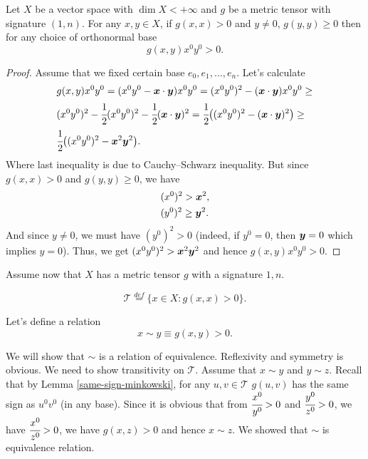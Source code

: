 \documentclass[main.tex]{subfiles}
\begin{document}
\begin{lemma}
\label{same-sign-minkowski}
Let $X$ be a vector space with $\dim X < +\infty$ and $g$ be a metric tensor with signature $(1, n)$. For any $x, y\in X$, if $g(x, x) > 0$ and $y\not=0$, $g(y, y) \geq 0$ then for any choice of orthonormal base
\begin{equation}
g(x, y)x^0y^0 > 0.
\end{equation} 
\end{lemma}
\begin{proof}
Assume that we fixed certain base $e_0, e_1, \dots, e_n$.
Let's calculate
\begin{align}
&g(x, y)x^0y^0 = (x^0y^0 - \boldsymbol{x}\cdot \boldsymbol{y})x^0y^0 = (x^0y^0)^2 - (\boldsymbol{x}\cdot \boldsymbol{y})x^0y^0 \geq \\
& (x^0y^0)^2 - \cfrac{1}{2}(x^0y^0)^2 - \cfrac{1}{2}(\boldsymbol{x}\cdot\boldsymbol{y})^2 = \cfrac{1}{2}\big( (x^0y^0)^2 - (\boldsymbol{x}\cdot \boldsymbol{y})^2\big) \geq \\
& \cfrac{1}{2}\big( (x^0y^0)^2 - \boldsymbol{x}^2\boldsymbol{y}^2\big).
\end{align}
Where last inequality is due to Cauchy–Schwarz inequality. But since $g(x, x) > 0$ and $g(y, y) \geq 0$, we have
\begin{align}
& (x^0)^2 > \boldsymbol{x}^2,\\
& (y^0)^2 \geq \boldsymbol{y}^2.
\end{align}
And since $y\not = 0$, we must have $(y^0)^2 > 0$ (indeed, if $y^0 = 0$, then $\boldsymbol{y} = 0$ which implies $y = 0$). Thus, we get $(x^0y^0)^2 > \boldsymbol{x}^2\boldsymbol{y}^2$ and hence $g(x, y)x^0y^0 > 0$.
\end{proof}

Assume now that $X$ has a metric tensor $g$ with a signature $1, n$.

\begin{equation}
\mathcal{T} \stackrel{def}{=} \{x\in X: g(x, x) > 0\}.
\end{equation}

Let's define a relation
\begin{equation}
x \sim y \equiv g(x, y) > 0.
\end{equation}

We will show that $\sim$ is a relation of equivalence. Reflexivity and symmetry is obvious. 
We need to show transitivity on $\mathcal{T}$. Assume that $x\sim y$ and $y\sim z$. Recall that by Lemma \ref{same-sign-minkowski}, for any $u, v\in\mathcal{T}$ $g(u, v)$ has the same sign as $u^0v^0$ (in any base). Since it is obvious that from $\cfrac{x^0}{y^0} > 0$ and $\cfrac{y^0}{z^0} > 0$, we have $\cfrac{x^0}{z^0} > 0$, we have $g(x, z) > 0$ and hence $x \sim z$. We showed that $\sim$ is equivalence relation.
\end{document}
